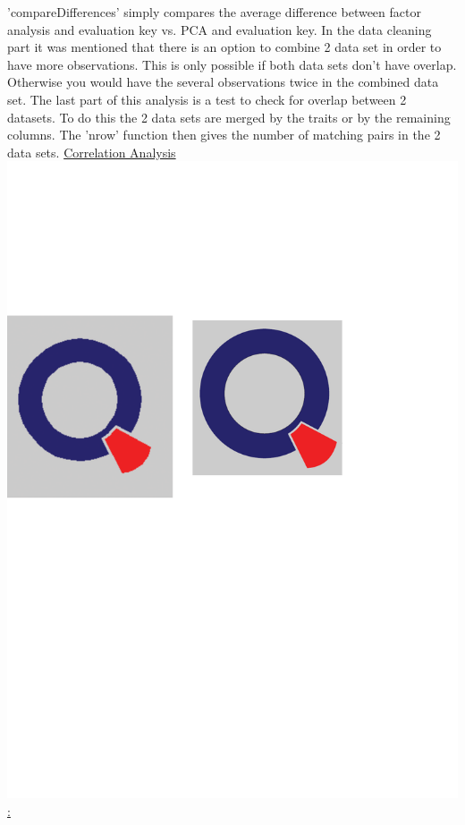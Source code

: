 \newline
'compareDifferences' simply compares the average difference between factor analysis and evaluation key vs. PCA and evaluation key.
\newline
In the data cleaning part it was mentioned that there is an option to combine 2 data set in order to have more observations. This is only possible if both data sets don't have overlap. Otherwise you would have the several observations twice in the combined data set. 
\newline
The last part of this analysis is a test to check for overlap between 2 datasets. To do this the 2 data sets are merged by the traits or by the remaining columns. The 'nrow' function then gives the number of matching pairs in the 2 data sets.  
\newline
\newline
\underline{Correlation Analysis \href{https://github.com/Matthias2193/SPL/blob/master/SPL_Big5CorrelationAnalysis/SPL_Big5CorrelationAnalysis.R}{\includegraphics[scale = 0.06]{Figures/qletlogo.pdf}} :} 
